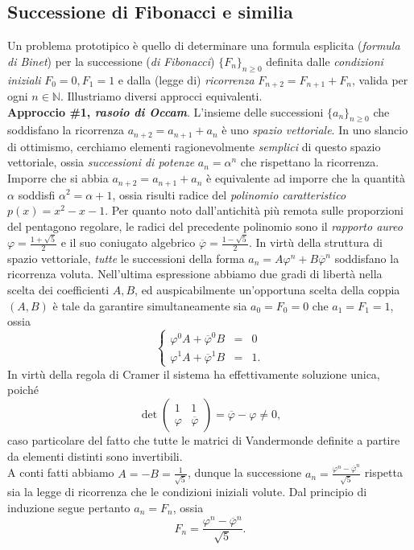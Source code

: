 \documentclass[a4paper,twoside]{article}
\newcommand{\N}{\mathbb{N}}
\theoremstyle{definition}
\numberwithin{theorem}{section}
\begin{document}
\subsection{Successione di Fibonacci e similia}
Un problema prototipico è quello di determinare una formula esplicita (\emph{formula di Binet}) per la successione (\emph{di Fibonacci}) $\{F_n\}_{n\geq 0}$ definita dalle \emph{condizioni iniziali} $F_0=0, F_1=1$ e dalla (legge di) \emph{ricorrenza} $F_{n+2}=F_{n+1}+F_n$, valida per ogni $n\in\N$. Illustriamo diversi approcci equivalenti.\\

\textbf{Approccio \#1, \emph{rasoio di Occam}}. L'insieme delle successioni $\{a_n\}_{n\geq 0}$ che soddisfano la ricorrenza $a_{n+2}=a_{n+1}+a_n$ è uno \emph{spazio vettoriale}. In uno slancio di ottimismo, cerchiamo elementi ragionevolmente \emph{semplici} di questo spazio vettoriale, ossia \emph{successioni di potenze} $a_n=\alpha^n$ che rispettano la ricorrenza.
Imporre che si abbia $a_{n+2}=a_{n+1}+a_n$ è equivalente ad imporre che la quantità $\alpha$ soddisfi $\alpha^2=\alpha+1$, ossia risulti radice del \emph{polinomio caratteristico} $p(x)=x^2-x-1$. Per quanto noto dall'antichità più remota sulle proporzioni del pentagono regolare, le radici del precedente polinomio sono il \emph{rapporto aureo} $\varphi=\frac{1+\sqrt{5}}{2}$ e il suo coniugato algebrico $\overline{\varphi}=\frac{1-\sqrt{5}}{2}$. In virtù della struttura di spazio vettoriale, \emph{tutte} le successioni della forma $a_n = A\varphi^n + B\overline{\varphi}^n$ soddisfano la ricorrenza voluta. Nell'ultima espressione abbiamo due gradi di libertà nella scelta dei coefficienti $A,B$, ed auspicabilmente un'opportuna scelta della coppia $(A,B)$ è tale da garantire simultaneamente sia $a_0=F_0=0$ che $a_1=F_1=1$, ossia 
$$ \left\{\begin{array}{rcl}\varphi^0 A + \overline{\varphi}^0 B &=& 0 \\ \varphi^1 A + \overline{\varphi}^1 B &=& 1.\end{array}\right. $$
In virtù della regola di Cramer il sistema ha effettivamente soluzione unica, poiché 
$$ \det \begin{pmatrix} 1 & 1 \\ \varphi & \overline{\varphi} \end{pmatrix}=\overline{\varphi}-\varphi \neq 0, $$
caso particolare del fatto che tutte le matrici di Vandermonde definite a partire da elementi distinti sono invertibili.\\
A conti fatti abbiamo $A=-B=\frac{1}{\sqrt{5}}$, dunque la successione $a_n=\frac{\varphi^n-\overline{\varphi}^n}{\sqrt{5}}$ rispetta sia la legge di ricorrenza che le condizioni iniziali volute. Dal principio di induzione segue pertanto $a_n=F_n$, ossia 
$$ F_n = \frac{\varphi^n-\overline{\varphi}^n}{\sqrt{5}}. $$
\end{document}
